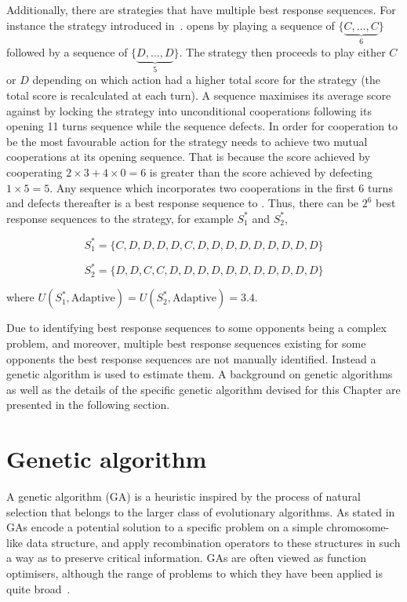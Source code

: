Additionally, there are strategies that have multiple best response sequences. For
instance the strategy \Adaptive introduced in~\cite{Li2011}. \Adaptive opens by
playing a sequence of \(\{\underbrace{C, \dots, C}_{6}\}\) followed by a
sequence of \(\{\underbrace{D, \dots, D}_{5}\}\). The strategy then proceeds to
play either \(C\) or \(D\) depending on which action had a higher total score
for the strategy (the total score is recalculated at each turn). A sequence
maximises its average score against \Adaptive by locking the strategy into
unconditional cooperations following its opening 11 turns sequence while the sequence
defects. In order
for cooperation to be the most favourable action for \Adaptive the strategy needs to achieve
two mutual cooperations at its opening sequence. That is because the score achieved
by cooperating \(2 \times 3 + 4 \times 0 = 6\) is greater than the
score achieved by defecting \(1 \times 5 = 5\).
Any sequence which incorporates two cooperations in the first 6 turns
and defects thereafter is a best response sequence to \Adaptive. Thus, there
can be \(2^{6}\) best response sequences to the strategy, for example \(S_{1}^*\) and \(S_{2}^*\),

\[S_{1}^* = \{C, D, D, D, D, C, D, D, D, D, D, D, D, D, D\}\]

\[S_{2}^* = \{D, D, C, C, D, D, D, D, D, D, D, D, D, D, D\}\]

where \(U(S_{1}^*, \text{Adaptive}) = U(S_{2}^*, \text{Adaptive}) = 3.4\).

Due to identifying best response sequences to some opponents being a complex
problem, and moreover, multiple best response sequences existing for some
opponents the best response sequences are not manually identified. Instead a
genetic algorithm is used to estimate them. A background on genetic algorithms
as well as the details of the specific genetic algorithm devised for this Chapter
are presented in the following section.

\section{Genetic algorithm}\label{section:genetic_algorithm}

A genetic algorithm (GA) is a heuristic inspired by the process of natural
selection that belongs to the larger class of evolutionary algorithms. As stated
in~\cite{Whitley1994} GAs encode a potential solution to a
specific problem on a simple chromosome-like data structure, and apply
recombination operators to these structures in such a way as to preserve
critical information. GAs are often viewed as function
optimisers, although the range of problems to which they have been
applied is quite broad~\cite{Hou1994, Jones1997, Yang1998}.

